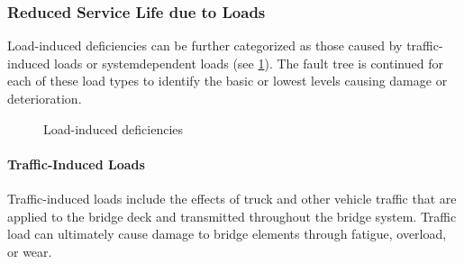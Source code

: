 \subsubsection{Reduced Service Life due to Loads}

Load-induced deficiencies can be further categorized as those caused by traffic-induced loads or systemdependent loads (see \cref{fig:load-induced-deficiencies}). The fault tree is continued for each of these load types to identify the basic or lowest levels causing damage or deterioration.

\begin{figure}
  \caption{Load-induced deficiencies}
  \label{fig:load-induced-deficiencies}
\end{figure}

\paragraph{Traffic-Induced Loads}

Traffic-induced loads include the effects of truck and other vehicle traffic that are applied to the bridge deck and transmitted throughout the bridge system. Traffic load can ultimately cause damage to bridge elements through
fatigue, overload, or wear.


